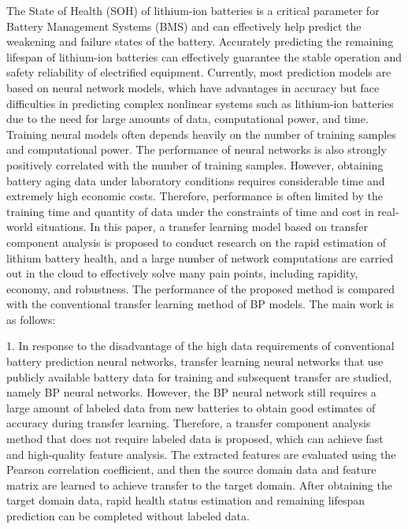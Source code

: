 \begin{enabstract}

      The State of Health (SOH) of lithium-ion batteries is a critical parameter for Battery Management Systems (BMS) and can effectively help predict the weakening and failure states of the battery. Accurately predicting the remaining lifespan of lithium-ion batteries can effectively guarantee the stable operation and safety reliability of electrified equipment. Currently, most prediction models are based on neural network models, which have advantages in accuracy but face difficulties in predicting complex nonlinear systems such as lithium-ion batteries due to the need for large amounts of data, computational power, and time. Training neural models often depends heavily on the number of training samples and computational power. The performance of neural networks is also strongly positively correlated with the number of training samples. However, obtaining battery aging data under laboratory conditions requires considerable time and extremely high economic costs. Therefore, performance is often limited by the training time and quantity of data under the constraints of time and cost in real-world situations. In this paper, a transfer learning model based on transfer component analysis is proposed to conduct research on the rapid estimation of lithium battery health, and a large number of network computations are carried out in the cloud to effectively solve many pain points, including rapidity, economy, and robustness. The performance of the proposed method is compared with the conventional transfer learning method of BP models. The main work is as follows:

      1. In response to the disadvantage of the high data requirements of conventional battery prediction neural networks, transfer learning neural networks that use publicly available battery data for training and subsequent transfer are studied, namely BP neural networks. However, the BP neural network still requires a large amount of labeled data from new batteries to obtain good estimates of accuracy during transfer learning. Therefore, a transfer component analysis method that does not require labeled data is proposed, which can achieve fast and high-quality feature analysis. The extracted features are evaluated using the Pearson correlation coefficient, and then the source domain data and feature matrix are learned to achieve transfer to the target domain. After obtaining the target domain data, rapid health status estimation and remaining lifespan prediction can be completed without labeled data.
      

\end{enabstract}
